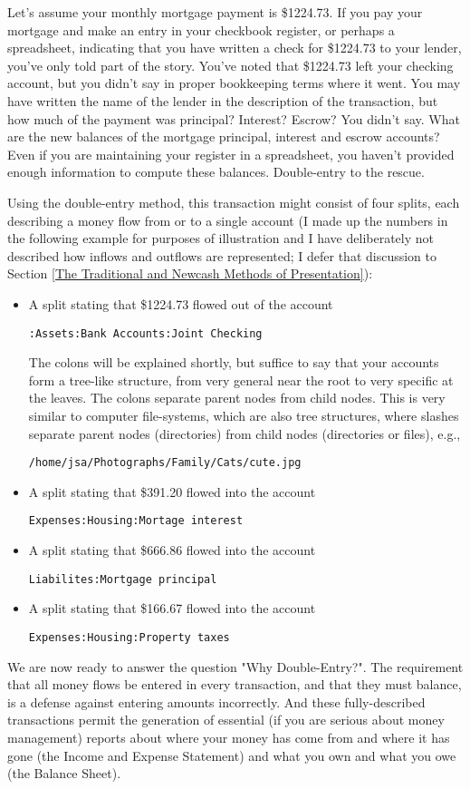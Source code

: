 \documentclass{report}
\begin{document}
Let's assume your monthly mortgage payment is \$1224.73. If you pay your mortgage and make an entry in your checkbook register, or perhaps a spreadsheet, indicating that you have written a check for \$1224.73 to your lender, you've only told part of the story. You've noted that \$1224.73 left your checking account, but you didn't say in proper bookkeeping terms where it went. You may have written the name of the lender in the description of the transaction, but how much of the payment was principal? Interest? Escrow? You didn't say. What are the new balances of the mortgage principal, interest and escrow accounts? Even if you are maintaining your register in a spreadsheet, you haven't provided enough information to compute these balances.  Double-entry to the rescue. 

Using the double-entry method, this transaction might consist of four splits, each describing a money flow from or to a single account (I made up the numbers in the following example for purposes of illustration and I have deliberately not described how inflows and outflows are represented; I defer that discussion to Section \ref{The Traditional and Newcash Methods of Presentation}):
\begin{itemize}
\item A split stating that \$1224.73 flowed out of the account
\begin{verbatim}
:Assets:Bank Accounts:Joint Checking
\end{verbatim}
The colons will be explained shortly, but suffice to say that your accounts form a tree-like structure, from very general near the root to very specific at the leaves. The colons separate parent nodes from child nodes. This is very similar to computer file-systems, which are also tree structures, where slashes separate parent nodes (directories) from child nodes (directories or files), e.g.,
\begin{verbatim}
/home/jsa/Photographs/Family/Cats/cute.jpg
\end{verbatim}
\item A split stating that \$391.20 flowed into the account 
\begin{verbatim}
Expenses:Housing:Mortage interest 
\end{verbatim}
\item A split stating that \$666.86 flowed into the account 
\begin{verbatim}
Liabilites:Mortgage principal
\end{verbatim}
\item A split stating that \$166.67 flowed into the account 
\begin{verbatim}
Expenses:Housing:Property taxes
\end{verbatim}
\end{itemize}
We are now ready to answer the question "Why Double-Entry?". The requirement that all money flows be entered in every transaction, and that they must balance, is a defense against entering amounts incorrectly. And these fully-described transactions permit the generation of essential (if you are serious about money management) reports about where your money has come from and where it has gone (the Income and Expense Statement) and what you own and what you owe (the Balance Sheet).
\end{document}

